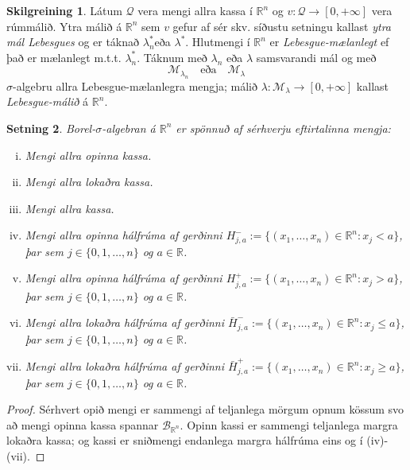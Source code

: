 \documentclass[a4paper,icelandic,11pt]{book}
\theoremstyle{plain}      \newtheorem{setn}{Setning}[chapter]
\theoremstyle{definition} \newtheorem{skilgr}[setn]{Skilgreining}
\theoremstyle{remark}     \newtheorem*{ath}{Athugasemd}
\newcommand{\R}{\mathbb R}
\begin{document}
\begin{skilgr}
  Látum $\mathcal Q$ vera mengi allra kassa í $\R^{n}$ og
  $v:\mathcal{Q}\to\left[0,+\infty\right]$ vera rúmmálið. Ytra málið á
  $\R^{n}$ sem $v$ gefur af sér skv. síðustu setningu kallast
  \emph{ytra mál Lebesgues} og er táknað
  $\lambda_{n}^{*} $eða $\lambda^{*}$. Hlutmengi í $\R^{n}$ er
  \emph{Lebesgue-mælanlegt} ef
  það er mælanlegt m.t.t. $\lambda_{n}^{*}$. Táknum með $\lambda_{n}$
  eða $\lambda$ samsvarandi mál og með
  \[
  \mathcal M_{\lambda_{n}}
  \quad\text{eða}\quad
  \mathcal M_{\lambda}
  \]
  $\sigma$-algebru allra Lebesgue-mælanlegra mengja; málið
  $\lambda:\mathcal M_{\lambda}\to\left[0,+\infty\right]$ kallast
  \emph{Lebesgue-málið} á $\R^{n}$.
\end{skilgr}
\begin{setn}
  Borel-$\sigma$-algebran á $\R^{n}$ er spönnuð af sérhverju
  eftirtalinna mengja:
  \begin{enumerate}[(i)]
  \item Mengi allra opinna kassa.
  \item Mengi allra lokaðra kassa.
  \item Mengi allra kassa.
  \item Mengi allra opinna hálfrúma af gerðinni
    $H^{-}_{j,a}:=\{(x_{1},\dots,x_{n})\in\R^{n}:x_{j}<a\}$, þar sem
    $j\in\{0,1,\dots,n\}$ og $a\in\R$.
  \item Mengi allra opinna hálfrúma af gerðinni
    $H^{+}_{j,a}:=\{(x_{1},\dots,x_{n})\in\R^{n}:x_{j}>a\}$, þar sem
    $j\in\{0,1,\dots,n\}$ og $a\in\R$.
  \item Mengi allra lokaðra hálfrúma af gerðinni
    $\bar{H}^{-}_{j,a}:=\{(x_{1},\dots,x_{n})\in\R^{n}:x_{j}\le a\}$,
    þar sem $j\in\{0,1,\dots,n\}$ og $a\in\R$.
  \item Mengi allra lokaðra hálfrúma af gerðinni
    $\bar{H}^{+}_{j,a}:=\{(x_{1},\dots,x_{n})\in\R^{n}:x_{j}\ge a\}$,
    þar sem $j\in\{0,1,\dots,n\}$ og $a\in\R$.
  \end{enumerate}
\end{setn}
\begin{proof}
  Sérhvert opið mengi er sammengi af teljanlega mörgum opnum kössum
  svo að mengi opinna kassa spannar $\mathcal B_{\R^{n}}$. Opinn
  kassi er sammengi teljanlega margra lokaðra kassa; og kassi er
  sniðmengi endanlega margra hálfrúma eins og í (iv)-(vii).
\end{proof}
\end{document}
